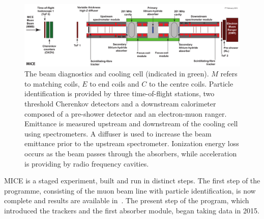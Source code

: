   \begin{figure}[b]
    \begin{center}
      \includegraphics[width=1.0\linewidth]{01-MICE/Cooling-demo-labels.pdf}
      \caption{\label{fig:CoolingChannel} The beam diagnostics and cooling cell (indicated in green). $M$ refers to matching coils, $E$ to end coils and $C$ to the centre coils. Particle identification is provided by three time-of-flight stations, two threshold Cherenkov detectors and a downstream calorimeter composed of a pre-shower detector and an electron-muon ranger. Emittance is measured upstream and downstream of the cooling cell using spectrometers. A diffuser is used to increase the beam emittance prior to the upstream spectrometer. Ionization energy loss occurs as the beam passes through the absorbers, while acceleration is providing by radio frequency cavities.}
    \end{center}
  \end{figure}

  MICE is a staged experiment, built and run in distinct steps. The first step of the programme, consisting of the muon beam line with particle identification, is now complete and results are available in~\cite{BeamlineJINST, BeamCharacterisationEurPhysJ, EMRJINST, PionContaminationJINST}. The present step of the program, which introduced the trackers and the first absorber module, began taking data in 2015. %


